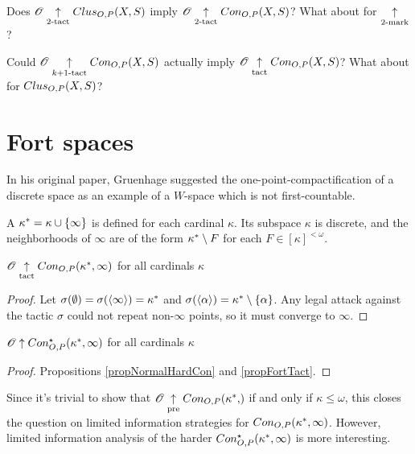 \begin{ques}
  Does $\mathscr{O} \underset{2\text{-tact}}{\uparrow} Clus_{O,P}(X,S)$ imply
  $\mathscr{O} \underset{2\text{-tact}}{\uparrow} Con_{O,P}(X,S)$? What about for $\underset{2\text{-mark}}{\uparrow}$?
\end{ques}

\begin{ques}
  Could $\mathscr{O} \underset{k+1\text{-tact}}{\uparrow} Con_{O,P}(X,S)$ actually imply
  $\mathscr{O} \underset{\text{tact}}{\uparrow} Con_{O,P}(X,S)$? What about for $Clus_{O,P}(X,S)$?
\end{ques}



\section{Fort spaces}

In his original paper, Gruenhage suggested the one-point-compactification of a
discrete space as an example of a $W$-space which is not first-countable.

\begin{defn}
  A  $\kappa^*=\kappa\cup\{\infty\}$ is defined
  for each cardinal $\kappa$. Its subspace $\kappa$ is discrete, and the
  neighborhoods of $\infty$ are of the form $\kappa^*\setminus F$
  for each $F\in[\kappa]^{<\omega}$.
\end{defn}

\begin{prop}\label{propFortTact}
  $\mathscr{O} \underset{\text{tact}}{\uparrow} Con_{O,P}(\kappa^*,\infty)$ for all cardinals $\kappa$
\end{prop}

\begin{proof}
  Let $\sigma(\emptyset)=\sigma(\langle\infty\rangle)=\kappa^*$ and
  $\sigma(\langle\alpha\rangle)=\kappa^*\setminus\{\alpha\}$. Any legal attack
  against the tactic $\sigma$ could not repeat non-$\infty$ points, so
  it must converge to $\infty$.
\end{proof}

\begin{cor}
  $\mathscr{O} \uparrow Con_{O,P}^\star(\kappa^*,\infty)$ for all cardinals $\kappa$
\end{cor}

\begin{proof}
  Propositions \ref{propNormalHardCon} and \ref{propFortTact}.
\end{proof}

Since it's trivial to show that $\pl O\prewin\congame{\oneptcomp\kappa}$ if and
only if $\kappa\leq\omega$, this closes the question on limited information
strategies for $Con_{O,P}(\kappa^*,\infty)$. However, limited
information analysis of the harder $Con_{O,P}^\star(\kappa^*,\infty)$
is more interesting.

